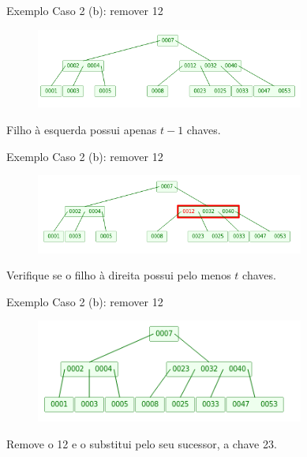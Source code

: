 \documentclass[aspectratio=169]{beamer}
\begin{document}
{\begin{frame}{Exemplo}
Caso 2 (b): remover 12
\begin{figure}[!h]
\centering
   \includegraphics[width=250pt]{imagens/remocao6.png}
  \label{fig_remocao6}
\end{figure} 
Filho à esquerda possui apenas $t-1$ chaves.
\end{frame}


\begin{frame}{Exemplo}
Caso 2 (b): remover 12
\begin{figure}[!h]
\centering
   \includegraphics[width=250pt]{imagens/remocao7.png}
  \label{fig_remocao7}
\end{figure} 
Verifique se o filho à direita possui pelo menos $t$ chaves.
\end{frame}


\begin{frame}{Exemplo}
Caso 2 (b): remover 12
\begin{figure}[!h]
\centering
   \includegraphics[width=250pt]{imagens/remocao8.png}
  \label{fig_remocao8}
\end{figure} 
Remove o 12 e o substitui pelo seu sucessor, a chave 23.
\end{frame}


}
\end{document}
